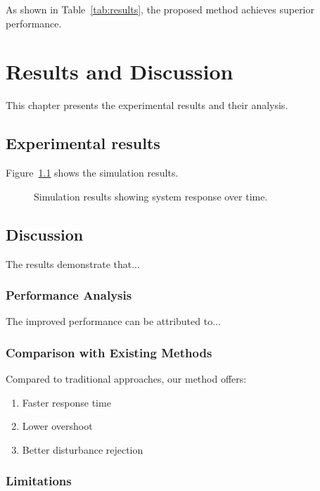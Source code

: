 \documentclass[11pt,a4paper,twoside,openright]{book}
\begin{document}
As shown in Table~\ref{tab:results}, the proposed method achieves superior performance.

\chapter{Results and Discussion}
\label{ch:results}

This chapter presents the experimental results and their analysis.

\section{Experimental results}

Figure~\ref{fig:simulation} shows the simulation results.

\begin{figure}[htbp]
    \centering
    \caption{Simulation results showing system response over time.}
    \label{fig:simulation}
\end{figure}

\section{Discussion}

The results demonstrate that...

\subsection{Performance Analysis}

The improved performance can be attributed to...

\subsection{Comparison with Existing Methods}

Compared to traditional approaches, our method offers:
\begin{enumerate}
    \item Faster response time
    \item Lower overshoot
    \item Better disturbance rejection
\end{enumerate}

\subsection{Limitations}
\end{document}
